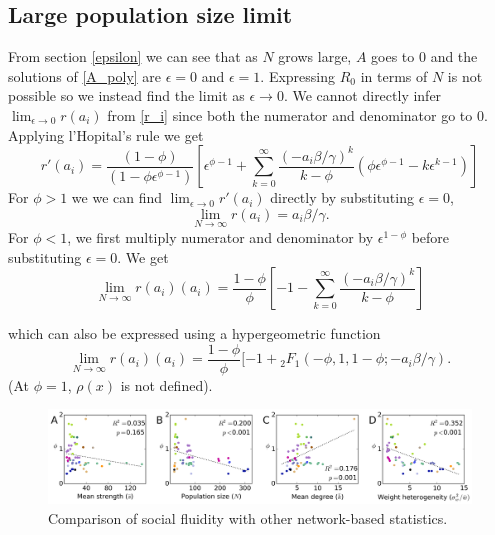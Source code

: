 \documentclass[twocolumn,8pt]{article}
\begin{document}
\subsection{Large population size limit}
From section \ref{epsilon} we can see that as $N$ grows large, $A$ goes to $0$ and the solutions of \eqref{A_poly} are $\epsilon=0$ and $\epsilon=1$. Expressing $R_{0}$ in terms of $N$ is not possible so we instead find the limit as $\epsilon\rightarrow 0$. 
We cannot directly infer $\lim_{\epsilon\rightarrow 0}r(a_{i})$ from \eqref{r_i} since both the numerator and denominator go to $0$. Applying l'Hopital's rule we get
\begin{equation}
r'(a_{i})=\frac{(1-\phi)}{(1-\phi\epsilon^{\phi-1})}\left[\epsilon^{\phi-1}+\sum_{k=0}^{\infty}\frac{(-a_{i}\beta/\gamma)^{k}}{k-\phi}(\phi\epsilon^{\phi-1}-k\epsilon^{k-1})\right]
\end{equation}
For $\phi>1$ we we can find $\lim_{\epsilon\rightarrow 0}r'(a_{i})$ directly by substituting $\epsilon=0$,
\begin{equation}
\lim_{N\rightarrow \infty}r(a_{i})=a_{i}\beta/\gamma.
\end{equation}
For $\phi<1$, we first multiply numerator and denominator by $\epsilon^{1-\phi}$ before substituting $\epsilon=0$. We get
\begin{equation}
\lim_{N\rightarrow \infty}r(a_{i})(a_{i})=\frac{1-\phi}{\phi}\left[-1-\sum_{k=0}^{\infty}\frac{(-a_{i}\beta/\gamma)^{k}}{k-\phi}\right]
\end{equation}

which can also be expressed using a hypergeometric function
\begin{equation} 
\label{big_N}
\lim_{N\rightarrow\infty}r(a_{i})(a_{i})=\frac{1-\phi}{\phi}[-1+{}_{2}F_{1}(-\phi,1,1-\phi;-a_{i}\beta/\gamma). 
\end{equation}
(At $\phi=1$, $\rho(x)$ is not defined).

\begin{figure}[t]
\centering
\includegraphics[width=\textwidth]{Figures/network_metrics.png}
\caption{Comparison of social fluidity with other network-based statistics.}
\label{Degree_vs_int}
\end{figure}
\end{document}
